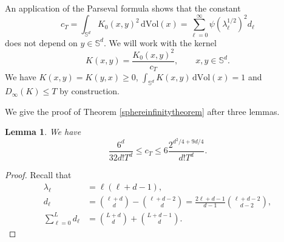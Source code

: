 \documentclass[11pt,a4paper]{article}
\newtheorem{lem}[thm]{Lemma}
\theoremstyle{definition}
\begin{document}
An application of the Parseval formula shows that the constant
\[ c_T = \int_{\mathbb{S}^d} K_0(x,y)^2 \, \mathrm{d}\mathrm{Vol}(x) = \sum_{\ell=0}^{\infty} \psi (\lambda_{\ell}^{1/2})^2 d_{\ell} \]
does not depend on $y \in \mathbb{S}^d$. We will work with the kernel
\[ K(x,y) = \frac{K_0(x,y)^2}{c_T} , \qquad x, y \in \mathbb{S}^d . \]
We have $K(x,y)=K(y,x) \ge 0$, $\int_{\mathbb{S}^d} K(x,y) \, \mathrm{d}\mathrm{Vol}(x)=1$ and $D_{\infty}(K) \le T$ by construction.

We give the proof of Theorem \ref{sphereinfinitytheorem} after three lemmas.
\begin{lem}\label{cTlemma} We have
\[ \frac{6^d}{32 d! T^d} \le c_T \le 6 \frac{2^{d^2/4+9d/4}}{d! T^d} . \]
\end{lem}

\begin{proof} Recall that
\[ \begin{split} \lambda_{\ell}&=\ell (\ell+d-1), \\ d_{\ell}&=\binom{\ell+d}{d} - \binom{\ell+d-2}{d} = \frac{2 \ell +d-1}{d-1} \binom{\ell+d-2}{d-2}, \\ \sum_{\ell=0}^L d_{\ell} &= \binom{L+d}{d} + \binom{L+d-1}{d}. \end{split} \]


\end{proof}
\end{document}
